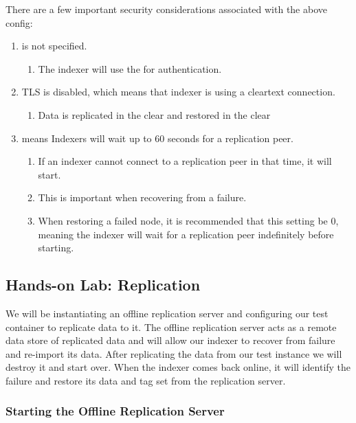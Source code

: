 {There are a few important security considerations associated with the
above config:
\begin{enumerate}
	\item {} is not specified.
	\begin{enumerate}
		\item The indexer will use the  for authentication.
	\end{enumerate}
	\item TLS is disabled, which means that indexer is using a cleartext connection.
	\begin{enumerate}
		\item Data is replicated in the clear and restored in the clear
	\end{enumerate}
	\item {} means Indexers will wait up to 60 seconds for a replication peer.
	\begin{enumerate}
		\item If an indexer cannot connect to a replication peer in that time, it will start.
		\item This is important when recovering from a failure.
		\item When restoring a failed node, it is recommended that this setting be 0, meaning the indexer will wait for a replication peer indefinitely before starting.
	\end{enumerate}
\end{enumerate}

\clearpage
\subsection{Hands-on Lab: Replication}

We will be instantiating an offline replication server and configuring
our test container to replicate data to it. The offline replication
server acts as a remote data store of replicated data and will allow our
indexer to recover from failure and re-import its data. After
replicating the data from our test instance we will destroy it and start
over. When the indexer comes back online, it will identify the failure
and restore its data and tag set from the replication server.

\subsubsection{Starting the Offline Replication Server}

}
